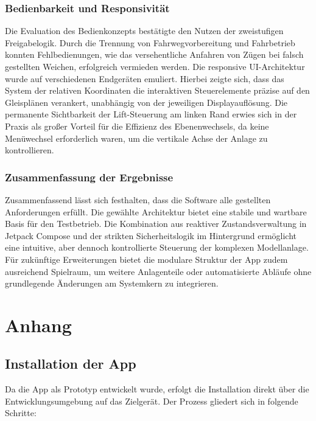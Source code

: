 \documentclass{article}
\begin{document}
\subsubsection{Bedienbarkeit und Responsivität}
Die Evaluation des Bedienkonzepts bestätigte den Nutzen der zweistufigen Freigabelogik.
Durch die Trennung von Fahrwegvorbereitung und Fahrbetrieb konnten Fehlbedienungen, wie das versehentliche Anfahren von Zügen bei falsch gestellten Weichen, erfolgreich vermieden werden.
Die responsive UI-Architektur wurde auf verschiedenen Endgeräten emuliert.
Hierbei zeigte sich, dass das System der relativen Koordinaten die interaktiven Steuerelemente präzise auf den Gleisplänen verankert, unabhängig von der jeweiligen Displayauflösung.
Die permanente Sichtbarkeit der Lift-Steuerung am linken Rand erwies sich in der Praxis als großer Vorteil für die Effizienz des Ebenenwechsels, da keine Menüwechsel erforderlich waren, um die vertikale Achse der Anlage zu kontrollieren.

\subsubsection{Zusammenfassung der Ergebnisse}
Zusammenfassend lässt sich festhalten, dass die Software alle gestellten Anforderungen erfüllt.
Die gewählte Architektur bietet eine stabile und wartbare Basis für den Testbetrieb.
Die Kombination aus reaktiver Zustandsverwaltung in Jetpack Compose und der strikten Sicherheitslogik im Hintergrund ermöglicht eine intuitive, aber dennoch kontrollierte Steuerung der komplexen Modellanlage.
Für zukünftige Erweiterungen bietet die modulare Struktur der App zudem ausreichend Spielraum, um weitere Anlagenteile oder automatisierte Abläufe ohne grundlegende Änderungen am Systemkern zu integrieren.

\section{Anhang}
\subsection{Installation der App}
Da die App als Prototyp entwickelt wurde, erfolgt die Installation direkt über die Entwicklungsumgebung auf das Zielgerät. Der Prozess gliedert sich in folgende Schritte:
\end{document}
